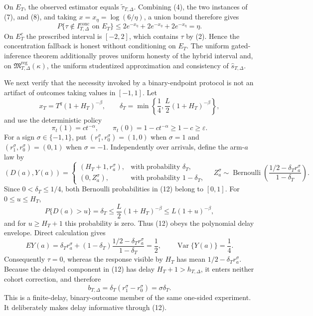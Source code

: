 On \(E_T\), the observed estimator equals \(\widetilde\tau_{T,\Delta}\).  Combining (4), the two instances of (7), and (8), and taking \(x=x_\eta=\log(6/\eta)\), a union bound therefore gives
\[
 P\{\tau\notin I_{T,\Delta}^{\mathrm{conc}}\text{ on }E_T\}
 \leq 2e^{-x_\eta}+2e^{-x_\eta}+2e^{-x_\eta}=\eta.
 \tag{9}
\]
On \(E_T^c\) the prescribed interval is \([-2,2]\), which contains \(\tau\) by (2).  Hence the concentration fallback is honest without conditioning on \(E_T\).  The uniform gated-inference theorem additionally proves uniform honesty of the hybrid interval and, on \(\mathfrak M_{T,\Delta}^{\mathrm{reg}}(\kappa)\), the uniform studentized approximation and consistency of \(\widehat s_{T,\Delta}\).

We next verify that the necessity invoked by a binary-endpoint protocol is not an artifact of outcomes taking values in \([-1,1]\).  Let
\[
 x_T=T^q(1+H_T)^{-\beta},\qquad
 \delta_T=\min\left\{\frac14,\frac L2(1+H_T)^{-\beta}\right\},
 \tag{10}
\]
and use the deterministic policy
\[
 \pi_t(1)=ct^{-\alpha},\qquad \pi_t(0)=1-ct^{-\alpha}\geq1-c\geq\varepsilon.
 \tag{11}
\]
For a sign \(\sigma\in\{-1,1\}\), put \((r_1^\sigma,r_0^\sigma)=(1,0)\) when \(\sigma=1\) and \((r_1^\sigma,r_0^\sigma)=(0,1)\) when \(\sigma=-1\).  Independently over arrivals, define the arm-\(a\) law by
\[
 (D(a),Y(a))=
 \begin{cases}
 (H_T+1,r_a^\sigma),&\text{with probability }\delta_T,\\
 (0,Z_a^\sigma),&\text{with probability }1-\delta_T,
 \end{cases}
 \quad
 Z_a^\sigma\sim\operatorname{Bernoulli}\!\left(
 \frac{1/2-\delta_T r_a^\sigma}{1-\delta_T}\right).
 \tag{12}
\]
Since \(0<\delta_T\leq1/4\), both Bernoulli probabilities in (12) belong to \([0,1]\).  For \(0\leq u\leq H_T\),
\[
 P\{D(a)>u\}=\delta_T
 \leq \frac L2(1+H_T)^{-\beta}
 \leq L(1+u)^{-\beta},
 \tag{13}
\]
and for \(u\geq H_T+1\) this probability is zero.  Thus (12) obeys the polynomial delay envelope.  Direct calculation gives
\[
 E Y(a)=\delta_T r_a^\sigma+(1-\delta_T)
 \frac{1/2-\delta_T r_a^\sigma}{1-\delta_T}=\frac12,
 \qquad \operatorname{Var}\{Y(a)\}=\frac14.
 \tag{14}
\]
Consequently \(\tau=0\), whereas the response visible by \(H_T\) has mean \(1/2-\delta_T r_a^\sigma\).  Because the delayed component in (12) has delay \(H_T+1>h_{T,\Delta}\), it enters neither cohort correction, and therefore
\[
 b_{T,\Delta}=\delta_T(r_1^\sigma-r_0^\sigma)=\sigma\delta_T.
 \tag{15}
\]
This is a finite-delay, binary-outcome member of the same one-sided experiment.  It deliberately makes delay informative through (12).

